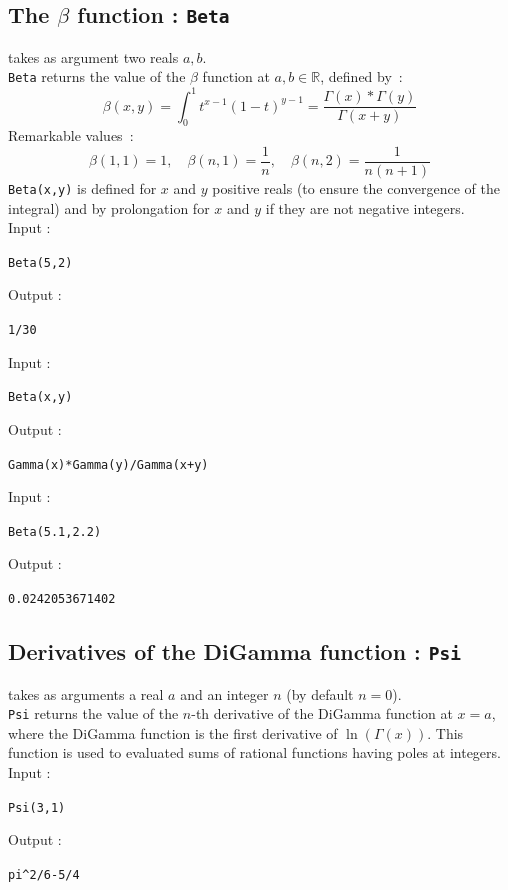 \documentclass[a4paper,11pt]{book}
\begin{document}
\subsection{The $\beta$ function : {\tt Beta}}
 takes as argument two reals $a,b$.\\
{\tt Beta} returns the value of the $\beta$ function at $a,b \in
\mathbb R$, defined by~:
\[ \beta(x,y)=\int_0^1 t^{x-1} (1-t)^{y-1}
=\frac{\Gamma(x)*\Gamma(y)}{\Gamma(x+y)} \]
Remarkable values~:
\[ \beta(1,1)=1, \quad \beta(n,1)=\frac{1}{n}, \quad 
\beta(n,2)=\frac{1}{n(n+1)} \]
{\tt Beta(x,y)} is defined for $x$ and $y$ positive reals 
(to ensure the convergence of the integral) and by
prolongation for $x$ and $y$ if they are not negative integers.\\
Input :
\begin{center}{\tt Beta(5,2)}\end{center}
Output :
\begin{center}{\tt 1/30}\end{center}
Input :
\begin{center}{\tt Beta(x,y)}\end{center}
Output :
\begin{center}{\tt Gamma(x)*Gamma(y)/Gamma(x+y)}\end{center}
Input :
\begin{center}{\tt Beta(5.1,2.2)}\end{center}
Output :
\begin{center}{\tt 0.0242053671402}\end{center}

\subsection{Derivatives of the DiGamma function : {\tt Psi}}
 takes as arguments a real $a$ and an integer $n$ (by 
default $n=0$).\\ 
{\tt Psi} returns the value of the $n$-th derivative of the DiGamma function 
at $x=a$, where the DiGamma function is the first derivative 
of $\ln(\Gamma(x))$. This function is used to evaluated sums of
rational functions having poles at integers.\\
Input :
\begin{center}{\tt Psi(3,1)}\end{center}
Output :
\begin{center}{\tt pi\verb|^|2/6-5/4}\end{center}
\end{document}
